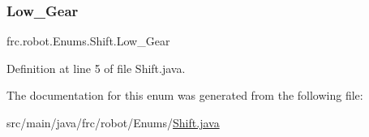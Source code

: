 \subsubsection{\texorpdfstring{Low\+\_\+\+Gear}{Low\_Gear}}
{\footnotesize\ttfamily frc.\+robot.\+Enums.\+Shift.\+Low\+\_\+\+Gear}



Definition at line 5 of file Shift.\+java.



The documentation for this enum was generated from the following file\+:\begin{DoxyCompactItemize}
\item 
src/main/java/frc/robot/\+Enums/\hyperlink{Shift_8java}{Shift.\+java}\end{DoxyCompactItemize}
